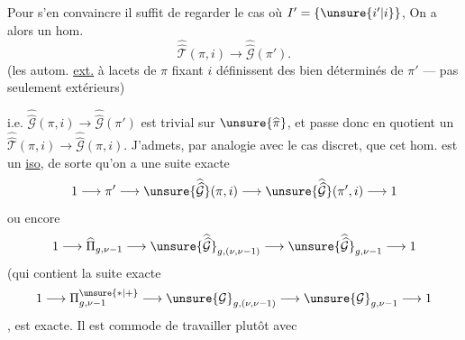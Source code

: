 Pour s'en convaincre il suffit de regarder
le cas où $I'=\{\unsure{i'|i}\}$, On a alors un hom.
\[
\widehat{\widehat{\mathcal T}}(\pi,i)\longrightarrow
\widehat{\widehat{\mathcal G}}(\pi').
\]
(les autom. \uline{ext.} à lacets de $\pi$ fixant $i$ définissent des
 bien déterminés de $\pi'$ --- pas seulement extérieurs)


i.e. $\widehat{\widehat{\mathcal G}}(\pi,i)\longrightarrow
\widehat{\widehat{\mathcal G}}(\pi')$ est trivial sur $\unsure{\widehat{\pi}}$, et
passe donc en quotient un
$\widehat{\widehat{\mathcal T}}(\pi,i)\longrightarrow
\widehat{\widehat{\mathcal G}}(\pi,i)$.
J'admets,  par analogie avec le cas discret,
que cet hom. est un \uline{iso}, de sorte qu'on a une suite exacte
\[
1\longrightarrow\pi'\longrightarrow
\unsure{\widehat{\widehat{\mathcal G}}}(\pi,i)\longrightarrow
\unsure{\widehat{\widehat{\mathcal G}}}(\pi',i)\longrightarrow1
\]
ou encore
\[
1\longrightarrow\widehat{\Pi}_{g,\nu-1}\longrightarrow
\unsure{\widehat{\widehat{\mathcal G}}}_{g,(\nu,\nu-1)}
\longrightarrow\unsure{\widehat{\widehat{\mathcal G}}}_{g,\nu-1}
\longrightarrow1
\]
(qui contient la suite exacte
\[
1\longrightarrow\Pi_{g,\nu-1}^{\unsure{*|+}}\longrightarrow
\unsure{\mathcal G}_{g,(\nu,\nu-1)}\longrightarrow
\unsure{\mathcal G}_{g,\nu-1}\longrightarrow1
\]
  , est exacte.
Il est commode de travailler plutôt avec
